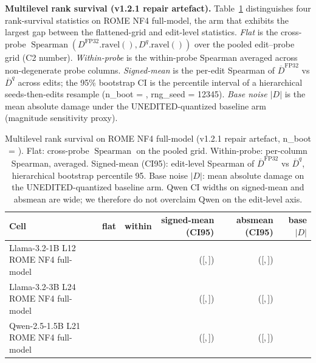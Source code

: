 \documentclass[preprint,12pt]{elsarticle}
\begin{document}
\textbf{Multilevel rank survival (v1.2.1 repair artefact).} Table~\ref{tab:multilevel}
distinguishes four rank-survival statistics on ROME NF4 full-model, the arm that
exhibits the largest gap between the flattened-grid and edit-level statistics.
\emph{Flat} is the cross-probe $\operatorname{Spearman}(D^{\mathrm{FP32}}.\mathrm{ravel}(),
D^{q}.\mathrm{ravel}())$ over the pooled edit--probe grid (C2 number).
\emph{Within-probe} is the within-probe Spearman averaged across
non-degenerate probe columns. \emph{Signed-mean} is the per-edit Spearman of
$\overline{D}^{\mathrm{FP32}}$ vs $\overline{D}^{q}$ across edits; the
95\% bootstrap CI is the percentile interval of a hierarchical
seeds-then-edits resample (n\_boot = \pRepairNBoot{}, rng\_seed = 12345).
\emph{Base noise $|D|$} is the mean absolute damage under the
UNEDITED-quantized baseline arm (magnitude sensitivity proxy).

\begin{table}[t]
\centering
\tiny
\setlength{\tabcolsep}{2pt}
\caption{Multilevel rank survival on ROME NF4 full-model (v1.2.1 repair artefact,
n\_boot = \pRepairNBoot{}). Flat: cross-probe $\operatorname{Spearman}$ on the pooled
grid. Within-probe: per-column Spearman, averaged. Signed-mean (CI95):
edit-level Spearman of $\overline{D}^{\mathrm{FP32}}$ vs $\overline{D}^{q}$,
hierarchical bootstrap percentile 95. Base noise $|D|$: mean absolute damage on
the UNEDITED-quantized baseline arm. Qwen CI widths on signed-mean and absmean
are wide; we therefore do not overclaim Qwen on the edit-level axis.}
\label{tab:multilevel}
\begin{tabular}{lrrrrr}
\toprule
Cell & flat & within & signed-mean (CI95) & absmean (CI95) & base $|D|$ \\
\midrule
Llama-3.2-1B L12 ROME NF4 full-model & \pPriFNFMFlat{} & \pPriFNFMWithin{} & \pPriFNFMSignPt{} ([\pPriFNFMSignLo{},\,\pPriFNFMSignHi{}]) & \pPriFNFMAbsPt{} ([\pPriFNFMAbsLo{},\,\pPriFNFMAbsHi{}]) & \pPriFNFMBase{} \\
Llama-3.2-3B L24 ROME NF4 full-model & \pSecFNFMFlat{} & \pSecFNFMWithin{} & \pSecFNFMSignPt{} ([\pSecFNFMSignLo{},\,\pSecFNFMSignHi{}]) & \pSecFNFMAbsPt{} ([\pSecFNFMAbsLo{},\,\pSecFNFMAbsHi{}]) & \pSecFNFMBase{} \\
Qwen-2.5-1.5B L21 ROME NF4 full-model & \pQwenFNFMFlat{} & \pQwenFNFMWithin{} & \pQwenFNFMSignPt{} ([\pQwenFNFMSignLo{},\,\pQwenFNFMSignHi{}]) & \pQwenFNFMAbsPt{} ([\pQwenFNFMAbsLo{},\,\pQwenFNFMAbsHi{}]) & \pQwenFNFMBase{} \\
\bottomrule
\end{tabular}
\end{table}
\end{document}
